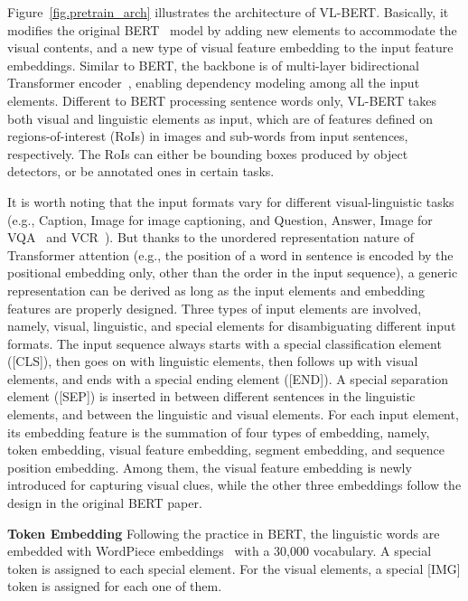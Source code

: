 \documentclass{article} \usepackage{iclr2020_conference,times}
\begin{document}
Figure~\ref{fig.pretrain_arch} illustrates the architecture of VL-BERT. Basically, it modifies the original BERT~\citep{devlin2018bert} model by adding new elements to accommodate the visual contents, and a new type of visual feature embedding to the input feature embeddings. Similar to BERT, the backbone is of multi-layer bidirectional Transformer encoder~\citep{vaswani2017transformer}, enabling dependency modeling among all the input elements. Different to BERT processing sentence words only, VL-BERT takes both visual and linguistic elements as input, which are of features defined on regions-of-interest (RoIs) in images and sub-words from input sentences, respectively. The RoIs can either be bounding boxes produced by object detectors, or be annotated ones in certain tasks.

It is worth noting that the input formats vary for different visual-linguistic tasks (e.g., Caption, Image for image captioning, and Question, Answer, Image for VQA~\citep{antol2015vqa,johnson2017clevr,goyal2017making,hudson2019gqa} and VCR~\citep{zellers2019vcr,gao2019two}). But thanks to the unordered representation nature of Transformer attention (e.g., the position of a word in sentence is encoded by the positional embedding only, other than the order in the input sequence), a generic representation can be derived as long as the input elements and embedding features are properly designed. Three types of input elements are involved, namely, visual, linguistic, and special elements for disambiguating different input formats. The input sequence always starts with a special classification element ([CLS]), then goes on with linguistic elements, then follows up with visual elements, and ends with a special ending element ([END]). A special separation element ([SEP]) is inserted in between different sentences in the linguistic elements, and between the linguistic and visual elements. For each input element, its embedding feature is the summation of four types of embedding, namely, token embedding, visual feature embedding, segment embedding, and sequence position embedding. Among them, the visual feature embedding is newly introduced for capturing visual clues, while the other three embeddings follow the design in the original BERT paper.



\textbf{Token Embedding} Following the practice in BERT, the linguistic words are embedded with WordPiece embeddings~\citep{wu2016google} with a 30,000 vocabulary. A special token is assigned to each special element. For the visual elements, a special [IMG] token is assigned for each one of them.
\end{document}
